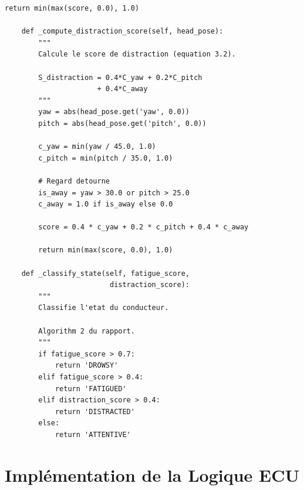 \documentclass[12pt,a4paper,twoside]{report}
\begin{document}
\begin{lstlisting}[style=pythonstyle, caption={Module d'analyse comportementale.}, label={lst:behavioral}]
        return min(max(score, 0.0), 1.0)
    
    def _compute_distraction_score(self, head_pose):
        """
        Calcule le score de distraction (equation 3.2).
        
        S_distraction = 0.4*C_yaw + 0.2*C_pitch 
                      + 0.4*C_away
        """
        yaw = abs(head_pose.get('yaw', 0.0))
        pitch = abs(head_pose.get('pitch', 0.0))
        
        c_yaw = min(yaw / 45.0, 1.0)
        c_pitch = min(pitch / 35.0, 1.0)
        
        # Regard detourne
        is_away = yaw > 30.0 or pitch > 25.0
        c_away = 1.0 if is_away else 0.0
        
        score = 0.4 * c_yaw + 0.2 * c_pitch + 0.4 * c_away
        
        return min(max(score, 0.0), 1.0)
    
    def _classify_state(self, fatigue_score, 
                         distraction_score):
        """
        Classifie l'etat du conducteur.
        
        Algorithm 2 du rapport.
        """
        if fatigue_score > 0.7:
            return 'DROWSY'
        elif fatigue_score > 0.4:
            return 'FATIGUED'
        elif distraction_score > 0.4:
            return 'DISTRACTED'
        else:
            return 'ATTENTIVE'
\end{lstlisting}

\section{Implémentation de la Logique ECU}
\end{document}

